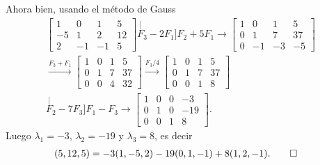 \documentclass[handout]{beamer} %
\begin{document}
    \begin{frame}
        Ahora bien, usando el método de Gauss
        \begin{multline*}
\left[\begin{array}{rrr|r}1 & 0 & 1 &  5 \\ -5 & 1 & 2 &  12 \\	2 & -1 & -1 &  5  \end{array}\right]
\stackrel[F_3 -2F_1]{F_2 + 5F_1}{\longrightarrow} 
\left[\begin{array}{rrr|r}1 & 0 & 1 &  5 \\ 0 & 1 & 7 &  37 \\	0 & -1 & -3 &  -5  \end{array}\right]
 \\ \stackrel{F_3+F_1}{\longrightarrow}
\left[\begin{array}{rrr|r}1 & 0 & 1 &  5 \\ 0 & 1 & 7 &  37 \\	0 & 0 & 4 & 32  \end{array}\right]
\stackrel{F_3/4}{\longrightarrow} 
\left[\begin{array}{rrr|r}1 & 0 & 1 & 5 \\ 0 & 1 & 7 & 37 \\	0 & 0 & 1& 8  \end{array}\right]
\\ \stackrel[F_2 -7F_3]{F_1 - F_3}{\longrightarrow}
\left[\begin{array}{rrr|r}1 & 0 & 0 & -3 \\ 0 & 1 & 0 &  -19 \\	0 & 0 & 1& 8  \end{array}\right].
\end{multline*}	  \pause
Luego $\lambda_1= -3$, $\lambda_2 = -19$ y $\lambda_3=8$,  es decir
\begin{align*}
(5,12,5) &= -3(1,-5,2)-19 (0,1,-1)+8 (1,2,-1).\qed
\end{align*}
    \end{frame}
                      
\end{document}
